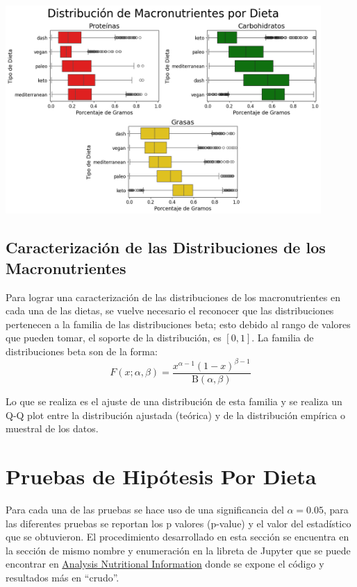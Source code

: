 \documentclass[12pt,a4paper]{article}
\begin{document}
            \begin{center}
                \includegraphics[width=0.90\textwidth]{Resources/2_03_plot_06.png}
            \end{center}
    
    \subsection{Caracterización de las Distribuciones de los Macronutrientes}
        Para lograr una caracterización de las distribuciones de los macronutrientes 
        en cada una de las dietas, se vuelve necesario el reconocer que las distribuciones 
        pertenecen a la familia de las distribuciones beta; esto debido al rango de valores 
        que pueden tomar, el soporte de la distribución, es $[0,1]$. La familia de distribuciones 
        beta son de la forma\cite{beta_distribution}:
        $$F(x;\alpha,\beta) = \frac {x^{\alpha -1}(1-x)^{\beta -1}}{\mathrm {B} (\alpha ,\beta )}$$ 

        Lo que se realiza es el ajuste de una distribución de esta familia y se realiza 
        un Q-Q plot entre la distribución ajustada (teórica) y de la distribución empírica 
        o muestral de los datos.\\

\newpage

\section{Pruebas de Hipótesis Por Dieta}

    Para cada una de las pruebas se hace uso de una significancia del $\alpha = 0.05$, 
    para las diferentes pruebas se reportan los p valores (p-value) y el valor del 
    estadístico que se obtuvieron. El procedimiento desarrollado en esta sección se 
    encuentra en la sección de mismo nombre y enumeración en la libreta de Jupyter 
    que se puede encontrar en \href{https://github.com/alexisuaguilaru/Analysis_Nutritional_Information/blob/main/Documentation/AlexisAguilar_Reporte.ipynb}{Analysis Nutritional Information} 
    donde se expone el código y resultados más en ``crudo''.
\end{document}
